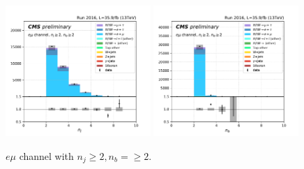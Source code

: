 \begin{figure}[ht]
    \includegraphics[width=0.49\textwidth]{chapters/Analysis/sectionPlots/figures/kinematics_pickles/emu2/2b/emu2_2b_nJets.pdf}
    \includegraphics[width=0.49\textwidth]{chapters/Analysis/sectionPlots/figures/kinematics_pickles/emu2/2b/emu2_2b_nBJets.pdf}
    
    \caption{$e\mu$ channel with $n_j\geq2, n_b=\geq2$.}
\end{figure}



